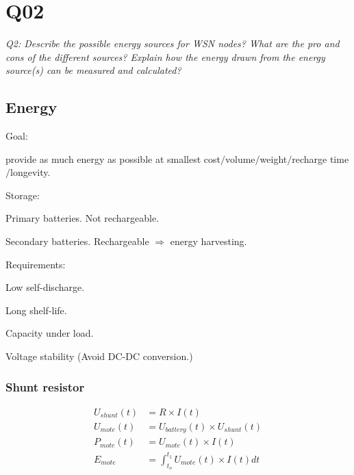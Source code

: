 \chapter{Q02}
\emph{Q2: Describe the possible energy sources for WSN nodes? What are the pro
and cons of the different sources? Explain how the energy drawn from the energy
source(s) can be measured and calculated?}

\section{Energy}

Goal: 
\begin{description}
\item provide as much energy as possible at smallest cost$\slash$volume$\slash$weight$\slash$recharge time$\slash$longevity.
\end{description}
Storage:
\begin{description}
\item Primary batteries. Not rechargeable.
\item Secondary batteries. Rechargeable $\Rightarrow$ energy harvesting.
\end{description}
Requirements:
\begin{description}
\item Low self-discharge.
\item Long shelf-life.
\item Capacity under load.
\item Voltage stability (Avoid DC-DC conversion.)
\end{description}

\subsection{Shunt resistor}

\begin{align*}
  U_{shunt}(t) &= R \times I(t) \\
  U_{mote}(t) &= U_{battery}(t) \times U_{shunt}(t) \\
  P_{mote} (t) &= U_{mote}(t) \times I(t) \\
  E_{mote} &= \int_{t_o}^{t_1} U_{mote}(t) \times I(t) dt
\end{align*}

